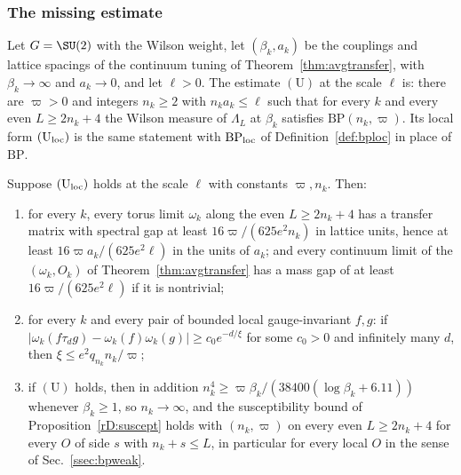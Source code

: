 \subsubsection{The missing estimate}

\begin{definition}
\label{rD:U}
Let $G=\SU(2)$ with the Wilson weight, let $(\beta_k,a_k)$ be the
couplings and lattice spacings of the continuum tuning of
Theorem~\ref{thm:avgtransfer}, with $\beta_k\to\infty$ and $a_k\to0$, and
let $\ell>0$. The estimate $(\mathrm U)$ at the scale $\ell$ is: there are
$\varpi>0$ and integers $n_k\ge2$ with $n_ka_k\le\ell$ such that for every
$k$ and every even $L\ge2n_k+4$ the Wilson measure of $\Lambda_L$ at
$\beta_k$ satisfies $\mathrm{BP}(n_k,\varpi)$. Its local
form $(\mathrm U_{\rm loc})$ is the same statement with
$\mathrm{BP}_{\rm loc}$ of Definition~\ref{def:bploc} in place of
$\mathrm{BP}$.
\end{definition}

\begin{proposition}
\label{rD:Uconsequences}
Suppose $(\mathrm U_{\rm loc})$ holds at the scale $\ell$ with constants
$\varpi,n_k$. Then:
\begin{enumerate}[label=\textup{(\roman*)},leftmargin=*]
\item for every $k$, every torus limit $\omega_k$ along the even $L\ge2n_k
+4$ has a transfer matrix with spectral gap at least $16\varpi/(625e^2n_k)$
in lattice units, hence at least $16\varpi a_k/(625e^2\ell)$ in the units
of $a_k$; and every continuum limit of the $(\omega_k,O_k)$ of
Theorem~\ref{thm:avgtransfer} has a mass gap of at least $16\varpi/(625e^2
\ell)$ if it is nontrivial;
\item for every $k$ and every pair of bounded local gauge-invariant $f,g$:
if $\lvert\omega_k(f\tau_dg)-\omega_k(f)\omega_k(g)\rvert\ge c_0e^{-d/\xi}$
for some $c_0>0$ and infinitely many $d$, then $\xi\le e^2q_{n_k}n_k/
\varpi$;
\item if $(\mathrm U)$ holds, then in addition $n_k^4\ge\varpi\beta_k/
(38400(\log\beta_k+6.11))$ whenever $\beta_k\ge1$, so $n_k\to\infty$, and
the susceptibility bound of Proposition~\ref{rD:suscept} holds with
$(n_k,\varpi)$ on every even $L\ge2n_k+4$ for every $O$ of side $s$ with
$n_k+s\le L$, in particular for every local $O$ in the sense of
Sec.~\ref{ssec:bpweak}.
\end{enumerate}
\end{proposition}

